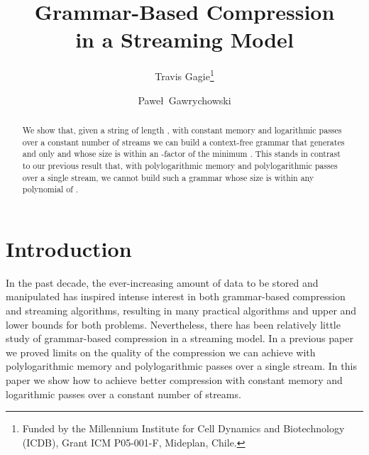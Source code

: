 \documentclass[runningheads]{llncs}
\begin{document}
\title{Grammar-Based Compression\\in a Streaming Model}
\author{Travis Gagie\fnmsep\thanks
    {Funded by the Millennium Institute for Cell Dynamics and Biotechnology (ICDB),
    Grant ICM P05-001-F, Mideplan, Chile.}
    \and Pawe\l\ Gawrychowski}
\maketitle

\begin{abstract}
We show that, given a string  of length , with constant memory and logarithmic passes over a constant number of streams we can build a context-free grammar that generates  and only  and whose size is within an -factor of the minimum .  This stands in contrast to our previous result that, with polylogarithmic memory and polylogarithmic passes over a single stream, we cannot build such a grammar whose size is within any polynomial of .
\end{abstract}

\section{Introduction} \label{sec:intro}

In the past decade, the ever-increasing amount of data to be stored and manipulated has inspired intense interest in both grammar-based compression and streaming algorithms, resulting in many practical algorithms and upper and lower bounds for both problems.  Nevertheless, there has been relatively little study of grammar-based compression in a streaming model.  In a previous paper~\cite{Gag09} we proved limits on the quality of the compression we can achieve with polylogarithmic memory and polylogarithmic passes over a single stream.  In this paper we show how to achieve better compression with constant memory and logarithmic passes over a constant number of streams.
\end{document}
